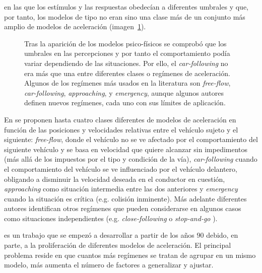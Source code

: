  en las que los estímulos y las respuestas obedecían a diferentes umbrales y que, por tanto, los modelos de tipo \textit{} no eran sino una clase más de un conjunto más amplio de modelos de aceleración (imagen~\ref{fig:acceleration-model-classes}).

\begin{figure}
	\centering
	\caption{Tras la aparición de los modelos psico-físicos se comprobó que los umbrales en las percepciones y por tanto el comportamiento podía variar dependiendo de las situaciones. Por ello, el \textit{car-following} no era más que una entre diferentes clases o regímenes de aceleración. Algunos de los regímenes más usados en la literatura son \textit{free-flow}, \textit{car-following}, \textit{approaching}, y \textit{emergency}, aunque algunos autores definen nuevos regímenes, cada uno con sus límites de aplicación.}
	\label{fig:acceleration-model-classes}
\end{figure}

En \cite{wiedemann1992microscopic} se proponen hasta cuatro clases diferentes de modelos de aceleración en función de las posiciones y velocidades relativas entre el vehículo sujeto y el siguiente: \textit{free-flow}, donde el vehículo no se ve afectado por el comportamiento del siguiente vehículo y se basa en velocidad que quiere alcanzar sin impedimentos (más allá de los impuestos por el tipo y condición de la vía), \textit{car-following} cuando el comportamiento del vehículo se ve influenciado por el vehículo delantero, obligando a disminuir la velocidad deseada en el conductor en cuestión, \textit{approaching} como situación intermedia entre las dos anteriores y \textit{emergency} cuando la situación es crítica (e.g. colisión inminente). Más adelante diferentes autores identifican otros regímenes que pueden considerarse en algunos casos como situaciones independientes (e.g. \textit{close-following} o \textit{stop-and-go} \cite{Toledo2003, Liu2013}).

 es un trabajo que se empezó a desarrollar a partir de los años $90$ debido, en parte, a la proliferación de diferentes modelos de aceleración. El principal problema reside en que cuantos más regímenes se tratan de agrupar en un mismo modelo, más aumenta el número de factores a generalizar y ajustar.

